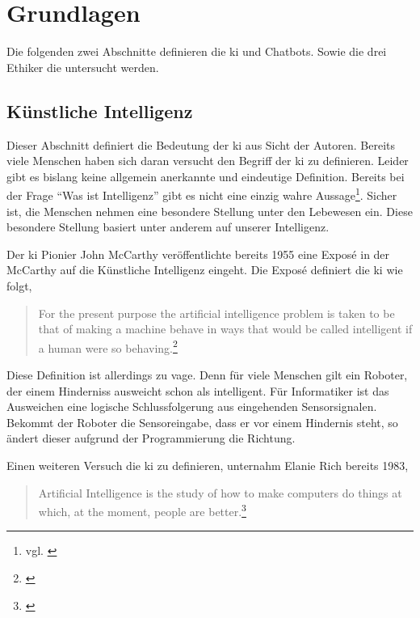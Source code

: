 \section{Grundlagen}
Die folgenden zwei Abschnitte definieren die \ac{ki} und Chatbots. Sowie die drei Ethiker die untersucht werden. 

\subsection{Künstliche Intelligenz}
Dieser Abschnitt definiert die Bedeutung der \ac{ki} aus Sicht der Autoren. Bereits viele Menschen haben sich daran versucht den Begriff der \ac{ki} zu definieren. Leider gibt es bislang keine allgemein anerkannte und eindeutige Definition. Bereits bei der Frage \enquote{Was ist Intelligenz} gibt es nicht eine einzig wahre Aussage\footnote{vgl. \cite{Intelligenz}}. Sicher ist, die Menschen nehmen eine besondere Stellung unter den Lebewesen ein. Diese besondere Stellung basiert unter anderem auf unserer Intelligenz. 

Der \ac{ki} Pionier John McCarthy veröffentlichte bereits 1955 eine Exposé in der McCarthy auf die Künstliche Intelligenz eingeht. Die Exposé definiert die \ac{ki} wie folgt,
\begin{quote}
		\glqq For the present purpose the artificial intelligence problem is taken to be that of making a machine behave in ways that would be called intelligent if a human were so behaving\grqq.\footnote{\cite{PROPOSALMcCarthy}}
\end{quote}
Diese Definition ist allerdings zu vage. Denn für viele Menschen gilt ein Roboter, der einem Hinderniss ausweicht schon als intelligent. Für Informatiker ist das Ausweichen eine logische Schlussfolgerung aus eingehenden Sensorsignalen. Bekommt der Roboter die Sensoreingabe, dass er vor einem Hindernis steht, so ändert dieser aufgrund der Programmierung die Richtung.

Einen weiteren Versuch die \ac{ki} zu definieren, unternahm Elanie Rich bereits 1983,
\begin{quote}
	 \glqq Artificial Intelligence is the study of how to make computers do things at which, at the moment, people are better\grqq.\footnote{\cite{ArtificialIntelligence}}
\end{quote}


